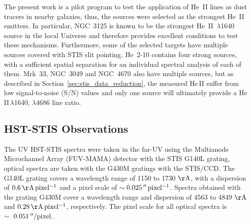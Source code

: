 \documentclass[linenumbers]{aastex63}
\begin{document}
The present work is a pilot program to test the application of He~II lines as dust tracers in nearby galaxies, thus, the sources were selected as the strongest He~II emitters. In particular, NGC~3125 is known to be the strongest He~II~$\lambda$1640 source in the local Universe \citep{chandar_ngc_2004} and therefore provides excellent conditions to test these mechanisms.
Furthermore, some of the selected targets have multiple sources covered with STIS slit pointing. He~2-10 contains four strong sources, with a sufficient spatial separation for an individual spectral analysis of each of them. Mrk~33, NGC~3049 and NGC~4670 also have multiple sources, but as described in Section~\ref{sec:stis_data_reduction}, the measured He\,II suffer from low signal-to-noise (S/N) values and only one source will ultimately provide a He\,II\,$\lambda$1640, $\lambda$4686 line ratio.


\subsection{HST-STIS Observations}\label{sect:stis_obs}
The UV HST-STIS spectra were taken in the far-UV using the Multianode Microchannel Array (FUV-MAMA) detector with the STIS G140L grating, optical spectra are taken with the G430M gratings with the STIS/CCD. 
The G140L grating covers a wavelength range of 1150 to 1730 ${\rm \AA}$, with a dispersion of $0.6\,{\rm \AA \, pixel^{-1}}$ and a pixel scale of $\sim0.025\,^{\prime\prime}\,{\rm pixel^{-1}}$.
Spectra obtained with the grating G430M cover a wavelength range and dispersion of 4563 to 4849 ${\rm \AA}$ and $0.28\,{\rm \AA \, pixel^{-1}}$, respectively. The pixel scale for all optical spectra is $\sim~0.051\,{\rm \mbox{$^{\prime\prime}$}/pixel}$.
\end{document}
